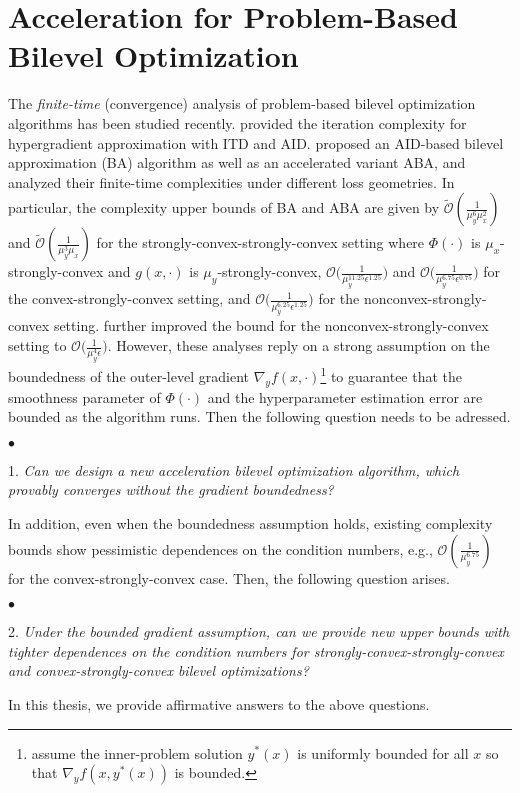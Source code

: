 \documentclass{osudissert96}
\begin{document}
\section{Acceleration for Problem-Based Bilevel Optimization}\label{intro:sec:acc}
The {\em finite-time} (convergence) analysis of problem-based bilevel optimization algorithms has been studied recently. \cite{grazzi2020iteration} provided the iteration complexity for hypergradient approximation with ITD and AID. \cite{ghadimi2018approximation} proposed an AID-based bilevel approximation (BA) algorithm as well as an accelerated variant ABA, and analyzed their finite-time complexities under different loss geometries. In particular, the complexity upper bounds of BA  and ABA are given by $\mathcal{\widetilde O}(\frac{1}{\mu_y^{6}\mu_x^{2}})$ and $\mathcal{ \widetilde O}(\frac{1}{\mu_y^{3}\mu_x })$ for the strongly-convex-strongly-convex setting where $\Phi(\cdot)$ is $\mu_x$-strongly-convex and $g(x,\cdot)$ is $\mu_y$-strongly-convex,  $\mathcal{O}\big(\frac{1}{\mu_y^{11.25}\epsilon^{1.25}}\big)$ and $\mathcal{ O}\big(\frac{1}{\mu_y^{6.75}\epsilon^{0.75}} \big)$ for the convex-strongly-convex setting, and $\mathcal{ O}\big(\frac{1}{\mu_y^{6.25}\epsilon^{1.25}} \big)$ for the nonconvex-strongly-convex setting.  \cite{ji2020bilevel} further improved the bound for the nonconvex-strongly-convex setting to $\mathcal{O}\big(\frac{1}{\mu_y^{4}\epsilon }\big)$. However, these analyses reply on a strong assumption on the boundedness of the outer-level gradient $\nabla_y f(x,\cdot)$\footnote{\cite{grazzi2020iteration} assume the inner-problem solution $y^*(x)$ is uniformly bounded for all $x$ so that $\nabla_y f(x,y^*(x))$ is bounded.} 
to guarantee that the smoothness parameter of $\Phi(\cdot)$ and the hyperparameter estimation error are bounded as the algorithm runs. Then the following question needs to be adressed. 

\begin{list}{$\bullet$}{\topsep=0.1in \leftmargin=0.2in \rightmargin=0.1in \itemsep =0.01in}
 \item[1.] \textit{Can we design a new acceleration bilevel optimization algorithm, which provably converges without the gradient boundedness?}
 \end{list} 
 In addition, even when the boundedness assumption holds, existing complexity bounds show pessimistic dependences on the condition numbers, e.g., $\mathcal{O}(\frac{1}{\mu_y^{6.75}})$ for the convex-strongly-convex case. Then, the following question arises. 
 \begin{list}{$\bullet$}{\topsep=0.1in \leftmargin=0.2in \rightmargin=0.1in \itemsep =0.01in}
 \item[2.] \textit{Under the bounded gradient assumption, can we provide new upper bounds with tighter dependences on the condition numbers for strongly-convex-strongly-convex and convex-strongly-convex
 bilevel optimizations?}
 \end{list} 
 In this thesis, we provide affirmative answers to the above questions. 
 
\end{document}
